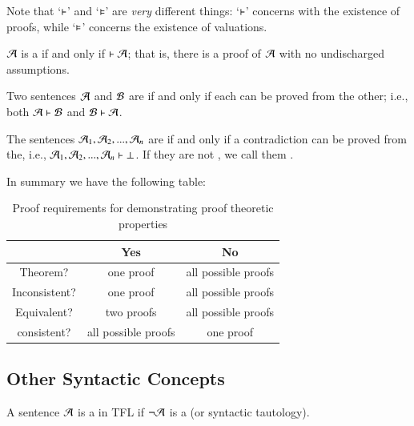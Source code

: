 \documentclass[12pt, a4paper, oneside, openright, titlepage]{book}
\begin{document}
\begin{rmk}
    Note that `$\vdash$' and `$\vDash$' are \emph{very} different things: `$\vdash$' concerns with the existence of proofs, while `$\vDash$' concerns the existence of valuations.
\end{rmk}

\begin{defn}
    $\mathcal{A}$ is a  if and only if $\vdash \mathcal{A}$; that is, there is a proof of $\mathcal{A}$ with no undischarged assumptions.
\end{defn}


\begin{defn}
    Two sentences $\mathcal{A}$ and $\mathcal{B}$ are  if and only if each can be proved from the other; i.e., both $\mathcal{A} \vdash \mathcal{B}$ and $\mathcal{B}\vdash\mathcal{A}$.
\end{defn}

\begin{defn}
    The sentences $\mathcal{A}_1,\mathcal{A}_2,...,\mathcal{A}_n$ are  if and only if a contradiction can be proved from the, i.e., $\mathcal{A}_1,\mathcal{A}_2,...,\mathcal{A}_n\vdash\bot$. If they are not , we call them .
\end{defn}


In summary we have the following table:

\begin{table}[H]
    \centering
    \caption{Proof requirements for demonstrating proof theoretic properties}
    \begin{tabular}{c|cc}
        & \textbf{Yes} & \textbf{No} \\ \hline
        Theorem? & one proof & all possible proofs \\
        Inconsistent? & one proof & all possible proofs \\
        Equivalent? & two proofs & all possible proofs \\
        consistent? & all possible proofs & one proof 
    \end{tabular}
\end{table}


\subsection{\textsection Other Syntactic Concepts}

\begin{defn}
    A sentence $\mathcal{A}$ is a  in TFL if $\neg\mathcal{A}$ is a  (or syntactic tautology).
\end{defn}
\end{document}

